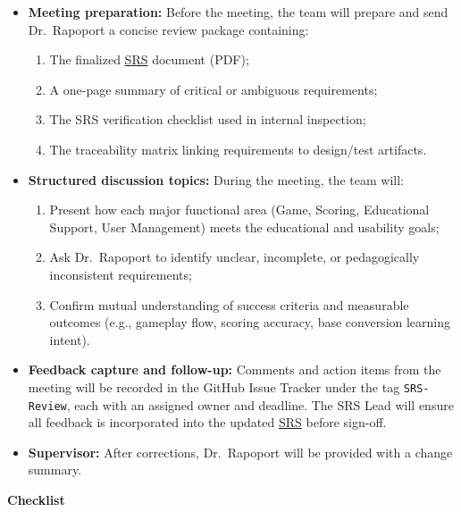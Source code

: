 \documentclass[12pt, titlepage]{article}
\begin{document}
\begin{itemize}
    \item \textbf{Meeting preparation:}  
    Before the meeting, the team will prepare and send Dr.\ Rapoport a concise review package containing:
    \begin{enumerate}
        \item The finalized \href{../SRS/SRS.pdf}{SRS} document (PDF);  
        \item A one-page summary of critical or ambiguous requirements;  
        \item The SRS verification checklist used in internal inspection;  
        \item The traceability matrix linking requirements to design/test artifacts.
    \end{enumerate}

    \item \textbf{Structured discussion topics:}  
    During the meeting, the team will:
    \begin{enumerate}
        \item Present how each major functional area (Game, Scoring, Educational Support, User Management) meets the educational and usability goals;
        \item Ask Dr.\ Rapoport to identify unclear, incomplete, or pedagogically inconsistent requirements;
        \item Confirm mutual understanding of success criteria and measurable outcomes (e.g., gameplay flow, scoring accuracy, base conversion learning intent).
    \end{enumerate}

    \item \textbf{Feedback capture and follow-up:}  
    Comments and action items from the meeting will be recorded in the GitHub Issue Tracker under the tag \texttt{SRS-Review}, each with an assigned owner and deadline.  
    The SRS Lead will ensure all feedback is incorporated into the updated \href{../SRS/SRS.pdf}{SRS} before sign-off.

    \item \textbf{Supervisor:}  
    After corrections, Dr.\ Rapoport will be provided with a change summary.
\end{itemize}
\noindent \textbf{Checklist}
\end{document}
